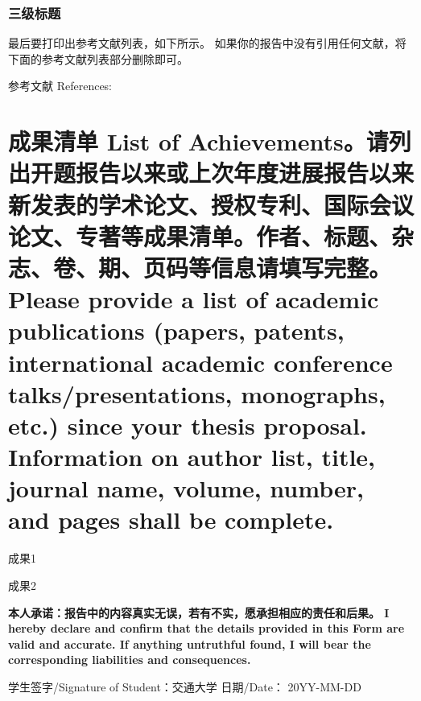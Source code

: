 \documentclass[a4paper,zihao=-4,AutoFakeBold]{ctexart}
\begin{document}
\subsubsection{三级标题}\label{subsub}

最后要打印出参考文献列表，如下所示。
如果你的报告中没有引用任何文献，将下面的参考文献列表部分删除即可。



\vspace{2\baselineskip}%
{%
    \linespread{1.25}\selectfont    %
    参考文献 References: 
    \printbibliography[heading=none]
}


\section{成果清单 List of Achievements。\mdseries 请列出开题报告以来或上次年度进展报告以来新发表的学术论文、授权专利、国际会议论文、专著等成果清单。作者、标题、杂志、卷、期、页码等信息请填写完整。Please provide a list of academic publications (papers, patents, international academic conference talks/presentations, monographs, etc.) since your thesis proposal. Information on author list, title, journal name, volume, number, and pages shall be complete.}

\begin{enumerate}[label={[\arabic*]}]
    \item 成果1
    \item 成果2
\end{enumerate}




\vspace{12pt}
\normalfont{}\bfseries\fangsong
本人承诺：报告中的内容真实无误，若有不实，愿承担相应的责任和后果。
I hereby declare and confirm that the details 
provided in this Form are valid and accurate. 
If anything untruthful found, 
I will bear the corresponding liabilities and consequences.

\vspace{\baselineskip}



\noindent
学生签字/Signature of Student：交通大学
\hfill              
日期/Date： 20YY-MM-DD
\end{document}
